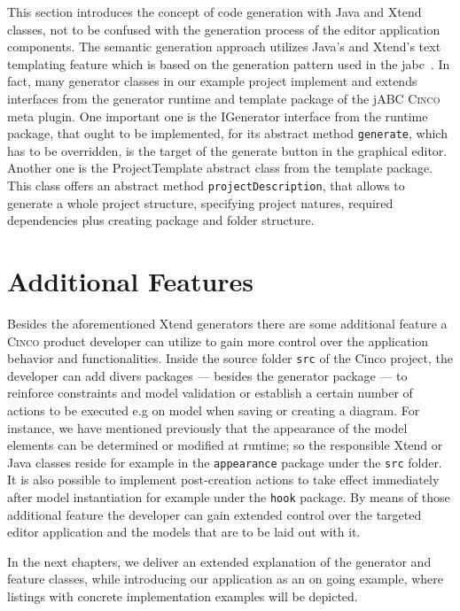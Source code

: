 This section introduces the concept of code generation with Java and Xtend classes, not to be confused with the generation process of the editor application components. The semantic generation approach utilizes Java's and Xtend's text templating feature which is based on the generation pattern used in the \acrfull{jabc}~\cite{model-driver-dev_jABC,jabc-home}. In fact, many generator classes in our example project implement and extends interfaces from the generator runtime and template package of the jABC \textsc{Cinco} meta plugin. One important one is the IGenerator interface from the runtime package, that ought to be implemented, for its abstract method \lstinline{generate}, which has to be overridden, is the target of the generate button in the graphical editor. Another one is the ProjectTemplate abstract class from the template package. This class offers an abstract method \lstinline{projectDescription}, that allows to generate a whole project structure, specifying project natures, required dependencies plus creating package and folder structure.

\section[]{Additional Features}

Besides the aforementioned Xtend generators there are some additional feature a \textsc{Cinco} product developer can utilize to gain more control over the application behavior and functionalities. Inside the source folder \lstinline{src} of the Cinco project, the developer can add divers packages --- besides the generator package --- to reinforce constraints and model validation or establish a certain number of actions to be executed e.g on model when saving or creating a diagram. For instance, we have mentioned previously that the appearance of the model elements can be determined or modified at runtime; so the responsible Xtend or Java classes reside for example in the \lstinline{appearance} package under the \lstinline{src} folder. It is also possible to implement post-creation actions to take effect immediately after model instantiation for example under the \lstinline{hook} package. By means of those additional feature the developer can gain extended control over the targeted editor application and the models that are to be laid out with it. 

In the next chapters, we deliver an extended explanation of the generator and feature classes, while introducing our application as an on going example, where listings with concrete implementation examples will be depicted.